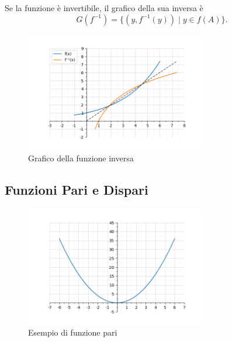 \documentclass[oneside,10pt]{book} %
\begin{document}
Se la funzione è invertibile, il grafico della sua inversa è
\[
G(f^{-1}) = \{(y, f^{-1}(y)) \mid y \in f(A)\}.
\]

\begin{figure}[h]
    \centering
    \includegraphics[width=0.7\textwidth]{./img/funzione_inversa.png} %
    \caption{Grafico della funzione inversa}
    \label{fig:funzione_inversa}
\end{figure}

\subsection{Funzioni Pari e Dispari}


\begin{figure}[h]
    \centering
    \includegraphics[width=0.7\textwidth]{./img/funzione_pari.png}
    \caption{Esempio di funzione pari}
    \label{fig:funzione_pari}
\end{figure}
\end{document}
